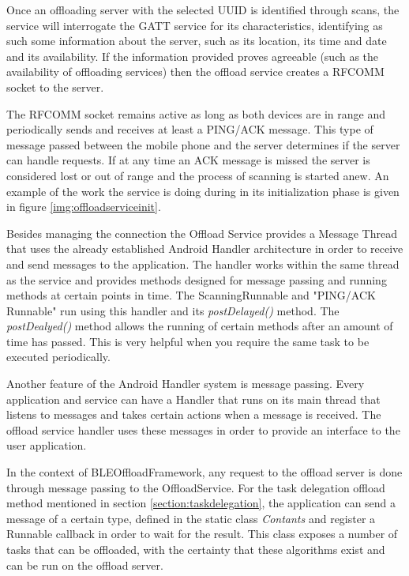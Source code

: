 Once an offloading server with the selected UUID is identified through scans, the service will interrogate the GATT service for its characteristics, identifying as such some information about the server, such as its location, its time and date and its availability. If the information provided proves agreeable (such as the availability of offloading services) then the offload service creates a RFCOMM socket to the server.

The RFCOMM socket remains active as long as both devices are in range and periodically sends and receives at least a PING/ACK message. This type of message passed between the mobile phone and the server determines if the server can handle requests. If at any time an ACK message is missed the server is considered lost or out of range and the process of scanning is started anew. An example of the work the service is doing during in its initialization phase is given in figure \ref{img:offloadserviceinit}.



Besides managing the connection the Offload Service provides a Message Thread that uses the already established Android Handler architecture in order to receive and send messages to the application. The handler works within the same thread as the service and provides methods designed for message passing and running methods at certain points in time. The ScanningRunnable and "PING/ACK Runnable" run using this handler and its \textit{postDelayed()} method. The \textit{postDealyed()} method allows the running of certain methods after an amount of time has passed. This is very helpful when you require the same task to be executed periodically.

Another feature of the Android Handler system is message passing. Every application and service can have a Handler that runs on its main thread that listens to messages and takes certain actions when a message is received. The offload service handler uses these messages in order to provide an interface to the user application.

In the context of BLEOffloadFramework, any request to the offload server is done through message passing to the OffloadService. For the task delegation offload method mentioned in section \ref{section:taskdelegation}, the application can send a message of a certain type, defined in the static class \textit{Contants} and register a Runnable callback in order to wait for the result. This class exposes a number of tasks that can be offloaded, with the certainty that these algorithms exist and can be run on the offload server.

